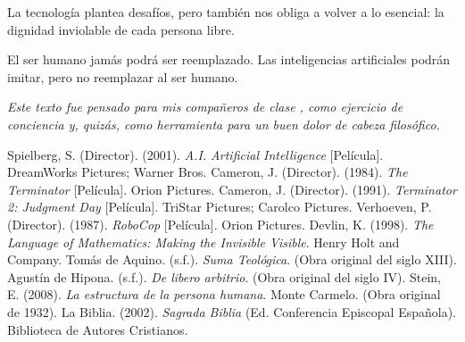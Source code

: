 \documentclass[12pt]{article}
\begin{document}
	La tecnología plantea desafíos, pero también nos obliga a volver a lo esencial: la dignidad inviolable de cada persona libre.
	
	El ser humano jamás podrá ser reemplazado. Las inteligencias artificiales podrán imitar, pero no reemplazar al ser humano.
	
\bigskip
\noindent\textit{Este texto fue pensado para mis compañeros de clase , como ejercicio de conciencia y, quizás, como herramienta para un buen dolor de cabeza filosófico.}

	
	\begin{thebibliography}{9}
		 Spielberg, S. (Director). (2001). \textit{A.I. Artificial Intelligence} [Película]. DreamWorks Pictures; Warner Bros.
		 Cameron, J. (Director). (1984). \textit{The Terminator} [Película]. Orion Pictures.
		 Cameron, J. (Director). (1991). \textit{Terminator 2: Judgment Day} [Película]. TriStar Pictures; Carolco Pictures.
		 Verhoeven, P. (Director). (1987). \textit{RoboCop} [Película]. Orion Pictures.
		 Devlin, K. (1998). \textit{The Language of Mathematics: Making the Invisible Visible}. Henry Holt and Company.
		 Tomás de Aquino. (s.f.). \textit{Suma Teológica}. (Obra original del siglo XIII).
		 Agustín de Hipona. (s.f.). \textit{De libero arbitrio}. (Obra original del siglo IV).
		 Stein, E. (2008). \textit{La estructura de la persona humana}. Monte Carmelo. (Obra original de 1932).
		 La Biblia. (2002). \textit{Sagrada Biblia} (Ed. Conferencia Episcopal Española). Biblioteca de Autores Cristianos.
	\end{thebibliography}
	
\end{document}
